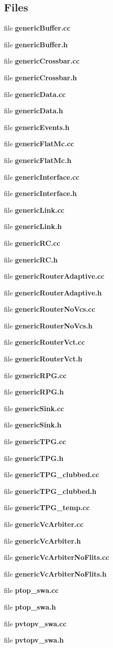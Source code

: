 \subsection*{Files}
\begin{CompactItemize}
\item 
file {\bf genericBuffer.cc}
\item 
file {\bf genericBuffer.h}
\item 
file {\bf genericCrossbar.cc}
\item 
file {\bf genericCrossbar.h}
\item 
file {\bf genericData.cc}
\item 
file {\bf genericData.h}
\item 
file {\bf genericEvents.h}
\item 
file {\bf genericFlatMc.cc}
\item 
file {\bf genericFlatMc.h}
\item 
file {\bf genericInterface.cc}
\item 
file {\bf genericInterface.h}
\item 
file {\bf genericLink.cc}
\item 
file {\bf genericLink.h}
\item 
file {\bf genericRC.cc}
\item 
file {\bf genericRC.h}
\item 
file {\bf genericRouterAdaptive.cc}
\item 
file {\bf genericRouterAdaptive.h}
\item 
file {\bf genericRouterNoVcs.cc}
\item 
file {\bf genericRouterNoVcs.h}
\item 
file {\bf genericRouterVct.cc}
\item 
file {\bf genericRouterVct.h}
\item 
file {\bf genericRPG.cc}
\item 
file {\bf genericRPG.h}
\item 
file {\bf genericSink.cc}
\item 
file {\bf genericSink.h}
\item 
file {\bf genericTPG.cc}
\item 
file {\bf genericTPG.h}
\item 
file {\bf genericTPG\_\-clubbed.cc}
\item 
file {\bf genericTPG\_\-clubbed.h}
\item 
file {\bf genericTPG\_\-temp.cc}
\item 
file {\bf genericVcArbiter.cc}
\item 
file {\bf genericVcArbiter.h}
\item 
file {\bf genericVcArbiterNoFlits.cc}
\item 
file {\bf genericVcArbiterNoFlits.h}
\item 
file {\bf ptop\_\-swa.cc}
\item 
file {\bf ptop\_\-swa.h}
\item 
file {\bf pvtopv\_\-swa.cc}
\item 
file {\bf pvtopv\_\-swa.h}
\end{CompactItemize}
